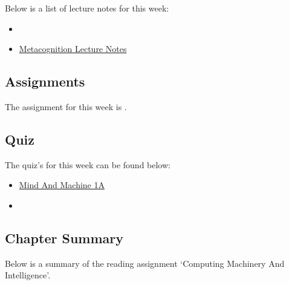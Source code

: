 \noindent Below is a list of lecture notes for this week:

\begin{itemize}
    \item {}
    \item \href{https://www.ldatschool.ca/metacognitive-strategies-or-thinking-about-my-thinking/}{Metacognition Lecture Notes}
\end{itemize}

\subsection{Assignments}

The assignment for this week is .  

\subsection{Quiz}

The quiz's for this week can be found below:

\begin{itemize}
    \item \href{https://applied.cs.colorado.edu/mod/quiz/view.php?id=49318}{Mind And Machine 1A}  
    \item {}
\end{itemize}

\subsection{Chapter Summary}

Below is a summary of the reading assignment `Computing Machinery And Intelligence'.

